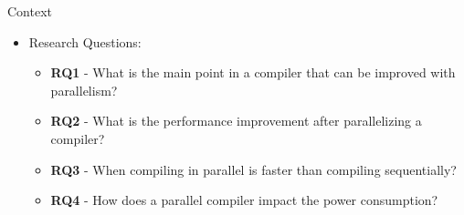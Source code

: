 
\begin{frame}{Context}
  \begin{itemize}
    \item Research Questions:
    \begin{itemize}
        \item \textbf{RQ1} - What is the main point in a compiler that can be improved with parallelism?
        \item \textbf{RQ2} - What is the performance improvement after parallelizing a compiler?
        \item \textbf{RQ3} - When compiling in parallel is faster than compiling sequentially?
        \item \textbf{RQ4} - How does a parallel compiler impact the power consumption?
    \end{itemize}
  \end{itemize}

\end{frame}

